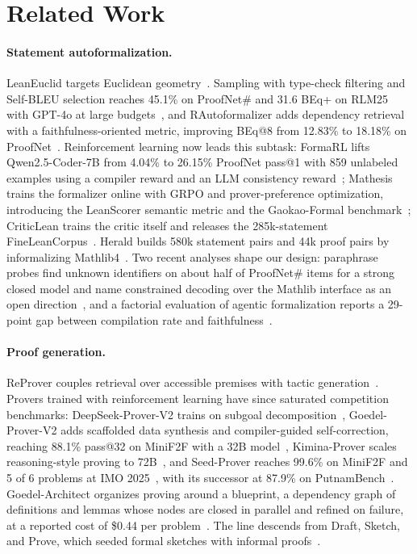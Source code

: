 \documentclass[sigconf,anonymous]{aamas}
\begin{document}
\section{Related Work}
{\color{red}
\paragraph{Statement autoformalization.} LeanEuclid targets Euclidean
geometry~\citep{leaneuclid2024}. Sampling with type-check filtering and
Self-BLEU selection reaches 45.1\% on ProofNet\# and 31.6 BEq+ on RLM25 with
GPT-4o at large budgets~\citep{poiroux2025beq}, and RAutoformalizer adds
dependency retrieval with a faithfulness-oriented metric, improving BEq@8 from
12.83\% to 18.18\% on ProofNet~\citep{rautoformalizer2025}. Reinforcement
learning now leads this subtask: FormaRL lifts Qwen2.5-Coder-7B from 4.04\% to
26.15\% ProofNet pass@1 with 859 unlabeled examples using a compiler reward and
an LLM consistency reward~\citep{formarl2025}; Mathesis trains the formalizer
online with GRPO and prover-preference optimization, introducing the LeanScorer
semantic metric and the Gaokao-Formal benchmark~\citep{mathesis2025}; CriticLean
trains the critic itself and releases the 285k-statement
FineLeanCorpus~\citep{criticlean2025}. Herald builds 580k statement pairs and
44k proof pairs by informalizing Mathlib4~\citep{herald2025}. Two recent
analyses shape our design: paraphrase probes find unknown identifiers on about
half of ProofNet\# items for a strong closed model and name constrained decoding
over the Mathlib interface as an open direction~\citep{surfacesens2026}, and a
factorial evaluation of agentic formalization reports a 29-point gap between
compilation rate and faithfulness~\citep{beyondcompilation2026}.

\paragraph{Proof generation.} ReProver couples retrieval over accessible
premises with tactic generation~\citep{leandojo2023}. Provers trained with
reinforcement learning have since saturated competition benchmarks:
DeepSeek-Prover-V2 trains on subgoal decomposition~\citep{deepseekproverv2},
Goedel-Prover-V2 adds scaffolded data synthesis and compiler-guided
self-correction, reaching 88.1\% pass@32 on MiniF2F with a 32B
model~\citep{goedelproverv2_2025}, Kimina-Prover scales reasoning-style proving
to 72B~\citep{kimina_prover_2025}, and Seed-Prover reaches 99.6\% on MiniF2F and
5 of 6 problems at IMO 2025~\citep{seedprover2025}, with its successor at 87.9\%
on PutnamBench~\citep{seedprover15_2025}. Goedel-Architect organizes proving
around a blueprint, a dependency graph of definitions and lemmas whose nodes are
closed in parallel and refined on failure, at a reported cost of \$0.44 per
problem~\citep{goedelarchitect2026, leanarchitect2026}. The line descends from
Draft, Sketch, and Prove, which seeded formal sketches with informal
proofs~\citep{dsp2023}.

}
\end{document}
